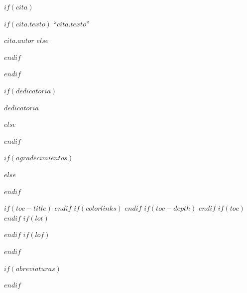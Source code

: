 
$if(cita)$

\thispagestyle{empty}

\vspace*{0.2\textheight}

$if(cita.texto)$
\noindent``{\itshape $cita.texto$}''\bigbreak

\hfill {$cita.autor$}
$else$

$endif$

$endif$
\newpage


$if(dedicatoria)$

\thispagestyle{empty}

\vspace*{0.3\textheight}
\begin{center}
{$dedicatoria$}
\end{center}
$else$


$endif$
\newpage


$if(agradecimientos)$
\thispagestyle{empty}



$else$


$endif$
\newpage


\begingroup
\thispagestyle{empty}
$if(toc-title)$
\renewcommand*\contentsname{$toc-title$}
$endif$
$if(colorlinks)$
\hypersetup{linkcolor=$if(toccolor)$$toccolor$$else$$endif$}
$endif$
$if(toc-depth)$
\setcounter{tocdepth}{$toc-depth$}
$endif$
$if(toc)$
\tableofcontents
$endif$
$if(lot)$
\listoftables
$endif$
$if(lof)$
\listoffigures
$endif$
\endgroup


$if(abreviaturas)$
\thispagestyle{empty}


\noindent

$endif$
